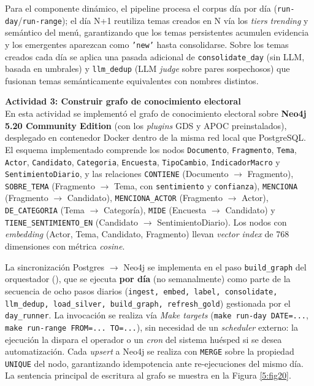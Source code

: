 Para el componente dinámico, el pipeline procesa el corpus día por día
(\texttt{run-day}/\texttt{run-range}); el día N+1 reutiliza temas creados en N
vía los \textit{tiers} \textit{trending} y semántico del menú, garantizando que
los temas persistentes acumulen evidencia y los emergentes aparezcan como
\texttt{'new'} hasta consolidarse. Sobre los temas creados cada día se aplica una
pasada adicional de \texttt{consolidate\_day} (sin LLM, basada en umbrales) y
\texttt{llm\_dedup} (LLM \textit{judge} sobre pares sospechosos) que fusionan
temas semánticamente equivalentes con nombres distintos.

\textbf{Actividad 3: Construir grafo de conocimiento electoral}
\\
En esta actividad se implementó el grafo de conocimiento electoral sobre
\textbf{Neo4j 5.20 Community Edition} (con los \textit{plugins} GDS y APOC
preinstalados), desplegado en contenedor Docker dentro de la misma red local que
PostgreSQL. El esquema implementado comprende los nodos
\texttt{Documento}, \texttt{Fragmento}, \texttt{Tema}, \texttt{Actor},
\texttt{Candidato}, \texttt{Categoria}, \texttt{Encuesta}, \texttt{TipoCambio},
\texttt{IndicadorMacro} y \texttt{SentimientoDiario}, y las relaciones
\texttt{CONTIENE} (Documento $\rightarrow$ Fragmento), \texttt{SOBRE\_TEMA}
(Fragmento $\rightarrow$ Tema, con \texttt{sentimiento} y \texttt{confianza}),
\texttt{MENCIONA} (Fragmento $\rightarrow$ Candidato), \texttt{MENCIONA\_ACTOR}
(Fragmento $\rightarrow$ Actor), \texttt{DE\_CATEGORIA} (Tema $\rightarrow$
Categoría), \texttt{MIDE} (Encuesta $\rightarrow$ Candidato) y
\texttt{TIENE\_SENTIMIENTO\_EN} (Candidato $\rightarrow$ SentimientoDiario). Los
nodos con \textit{embedding} (Actor, Tema, Candidato, Fragmento) llevan
\textit{vector index} de 768 dimensiones con métrica \textit{cosine}.

La sincronización Postgres $\rightarrow$ Neo4j se implementa en el paso
\texttt{build\_graph} del orquestador
(), que se ejecuta
\textbf{por día} (no semanalmente) como parte de la secuencia de ocho pasos
diarios (\texttt{ingest, embed, label, consolidate, llm\_dedup, load\_silver,
build\_graph, refresh\_gold}) gestionada por el \texttt{day\_runner}. La
invocación se realiza vía \textit{Make targets} (\texttt{make run-day DATE=...},
\texttt{make run-range FROM=... TO=...}), sin necesidad de un \textit{scheduler}
externo: la ejecución la dispara el operador o un \textit{cron} del sistema
huésped si se desea automatización. Cada \textit{upsert} a Neo4j se realiza con
\texttt{MERGE} sobre la propiedad \texttt{UNIQUE} del nodo, garantizando
idempotencia ante re-ejecuciones del mismo día. La sentencia principal de
escritura al grafo se muestra en la Figura \ref{5:fig20}.

